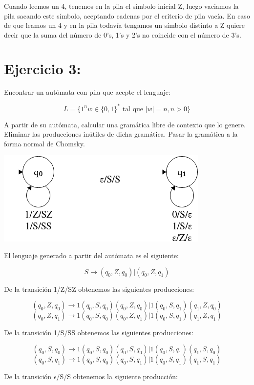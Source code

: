 \documentclass[12pt, spanish]{article}
\begin{document}
Cuando leemos un 4, tenemos en la pila el símbolo inicial Z, luego vaciamos la pila sacando este símbolo, aceptando cadenas por el criterio de pila vacía. En caso de que leamos un 4 y en la pila todavía tengamos un símbolo distinto a Z quiere decir que la suma del número de 0's, 1's y 2's no coincide con el número de 3's.


\newpage

\section{Ejercicio 3:} Encontrar un autómata con pila que acepte el lenguaje:

$$ L = \{1^nw \in \{0,1\}^* \text{ tal que } |w|=n, n > 0 \}  $$

A partir de su autómata, calcular una gramática libre de contexto que lo genere. Eliminar las producciones inútiles de dicha gramática. Pasar la gramática a la forma normal de Chomsky.


\begin{center}
\includegraphics[scale=0.55]{pila_2.png}
\end{center}

El lenguaje generado a partir del autómata es el siguiente:

$$ S \rightarrow (q_0, Z, q_0) | (q_0, Z, q_1)  $$

De la transición 1/Z/SZ obtenemos las siguientes producciones:

$$ (q_0, Z, q_0) \rightarrow 1(q_0, S, q_0)(q_0, Z, q_0) | 1(q_0, S, q_1)(q_1, Z, q_0) $$
$$ (q_0, Z, q_1) \rightarrow 1(q_0, S, q_0)(q_0, Z, q_1) | 1(q_0, S, q_1)(q_1, Z, q_1) $$


De la transición 1/S/SS obtenemos las siguientes producciones:

$$ (q_0, S, q_0) \rightarrow 1(q_0, S, q_0)(q_0, S, q_0) | 1(q_0, S, q_1)(q_1, S, q_0) $$
$$ (q_0, S, q_1) \rightarrow 1(q_0, S, q_0)(q_0, S, q_1) | 1(q_0, S, q_1)(q_1, S, q_1) $$

De la transición $\epsilon$/S/S obtenemos la siguiente producción:
\end{document}
